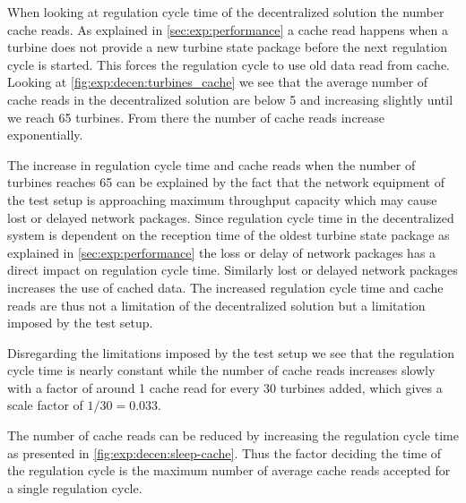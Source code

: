 When looking at regulation cycle time of the decentralized solution the number cache reads.
As explained in \cref{sec:exp:performance} a cache read happens when a turbine does not provide a new turbine state package before the next regulation cycle is started.
This forces the regulation cycle to use old data read from cache.
Looking at \cref{fig:exp:decen:turbines_cache} we see that the average number of cache reads in the decentralized solution are below 5 and increasing slightly until we reach 65 turbines. From there the number of cache reads increase exponentially.

The increase in regulation cycle time and cache reads when the number of turbines reaches 65 can be explained by the fact that the network equipment of the test setup is approaching maximum throughput capacity which may cause lost or delayed network packages.
Since regulation cycle time in the decentralized system is dependent on the reception time of the oldest turbine state package as explained in \cref{sec:exp:performance} the loss or delay of network packages has a direct impact on regulation cycle time.
Similarly lost or delayed network packages increases the use of cached data. The increased regulation cycle time and cache reads are thus not a limitation of the decentralized solution but a limitation imposed by the test setup.

Disregarding the limitations imposed by the test setup we see that the regulation cycle time is nearly constant while the number of cache reads increases slowly with a factor of around 1 cache read for every 30 turbines added, which gives a scale factor of $1 / 30 = 0.033$.

The number of cache reads can be reduced by increasing the regulation cycle time as presented in \cref{fig:exp:decen:sleep-cache}.
Thus the factor deciding the time of the regulation cycle is the maximum number of average cache reads accepted for a single regulation cycle.

